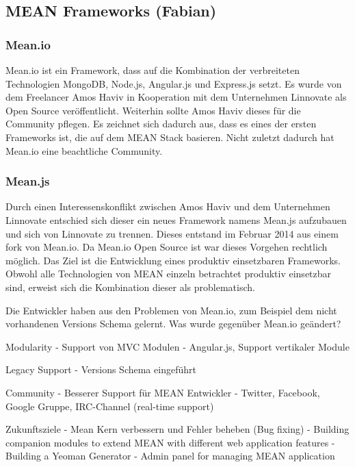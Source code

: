 \subsection{MEAN Frameworks (Fabian)}\label{mean-frameworks-fabian}

\subsubsection{Mean.io}\label{mean.io}

Mean.io ist ein Framework, dass auf die Kombination der verbreiteten
Technologien MongoDB, Node.js, Angular.js und Express.js setzt. Es wurde
von dem Freelancer Amos Haviv in Kooperation mit dem Unternehmen
Linnovate als Open Source veröffentlicht. Weiterhin sollte Amos Haviv
dieses für die Community pflegen. Es zeichnet sich dadurch aus, dass es
eines der ersten Frameworks ist, die auf dem MEAN Stack basieren. Nicht
zuletzt dadurch hat Mean.io eine beachtliche Community.

\subsubsection{Mean.js}\label{mean.js}

Durch einen Interessenskonflikt zwischen Amos Haviv und dem Unternehmen
Linnovate entschied sich dieser ein neues Framework namens Mean.js
aufzubauen und sich von Linnovate zu trennen. Dieses entstand im Februar
2014 aus einem fork von Mean.io. Da Mean.io Open Source ist war dieses
Vorgehen rechtlich möglich. Das Ziel ist die Entwicklung eines produktiv
einsetzbaren Frameworks. Obwohl alle Technologien von MEAN einzeln
betrachtet produktiv einsetzbar sind, erweist sich die Kombination
dieser als problematisch.

Die Entwickler haben aus den Problemen von Mean.io, zum Beispiel dem
nicht vorhandenen Versions Schema gelernt. Was wurde gegenüber Mean.io
geändert?

Modularity - Support von MVC Modulen - Angular.js, Support vertikaler
Module

Legacy Support - Versions Schema eingeführt

Community - Besserer Support für MEAN Entwickler - Twitter, Facebook,
Google Gruppe, IRC-Channel (real-time support)

Zukunftsziele - Mean Kern verbessern und Fehler beheben (Bug fixing) -
Building companion modules to extend MEAN with different web application
features - Building a Yeoman Generator - Admin panel for managing MEAN
application

